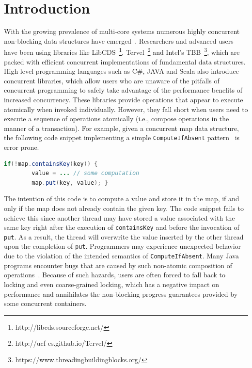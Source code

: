 \documentclass[]{sig-alternate-05-2015}
\begin{document}
\section{Introduction}
\label{sec:intro}
With the growing prevalence of multi-core systems numerous highly concurrent non-blocking data structures have emerged~\cite{linden2013skiplist,ellen2010non,braginsky2012lock,zhang2015lockfree,michael2002high}.
Researchers and advanced users have been using libraries like LibCDS~\footnote{http://libcds.sourceforge.net/}, Tervel~\footnote{http://ucf-cs.github.io/Tervel/} and Intel's TBB~\footnote{https://www.threadingbuildingblocks.org/}, which are packed with efficient concurrent implementations of fundamental data structures.
High level programming languages such as C\#, JAVA and Scala also introduce concurrent libraries, which allow users who are unaware of the pitfalls of concurrent programming to safely take advantage of the performance benefits of increased concurrency.
These libraries provide operations that appear to execute atomically when invoked individually.
However, they fall short when users need to execute a sequence of operations atomically (i.e., compose operations in the manner of a transaction).
For example, given a concurrent map data structure, the following code snippet implementing a simple \texttt{ComputeIfAbsent} pattern~\cite{golan2013concurrent} is error prone.
\begin{lstlisting}[basicstyle=\small,language=JAVA]
    if(!map.containsKey(key)) {
        value = ... // some computation
        map.put(key, value); }
\end{lstlisting}
The intention of this code is to compute a value and store it in the map, if and only if the map does not already contain the given key.
The code snippet fails to achieve this since another thread may have stored a value associated with the same key right after the execution of \texttt{containsKey} and before the invocation of \texttt{put}.
As a result, the thread will overwrite the value inserted by the other thread upon the completion of \texttt{put}.
Programmers may experience unexpected behavior due to the violation of the intended semantics of \texttt{ComputeIfAbsent}.
Many Java programs encounter bugs that are caused by such non-atomic composition of operations~\cite{shacham2011testing}.
Because of such hazards, users are often forced to fall back to locking and even coarse-grained locking, which has a negative impact on performance and annihilates the non-blocking progress guarantees provided by some concurrent containers.
\end{document}
